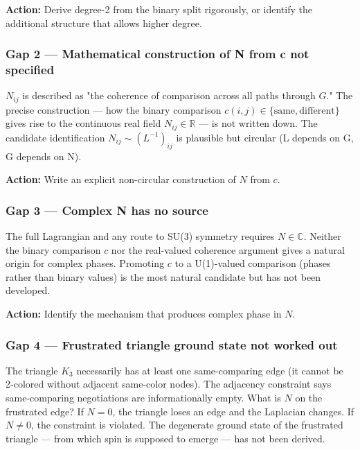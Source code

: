 \documentclass[11pt,letterpaper]{article}
\begin{document}
\textbf{Action:} Derive degree-2 from the binary split rigorously, or identify the additional structure that allows higher degree.

\subsubsection{Gap 2 --- Mathematical construction of N from c not specified}
\label{sec:org72179f7}

\(N_{ij}\) is described as "the coherence of comparison across all paths through \(G\)." The precise construction --- how the binary comparison \(c(i,j) \in \{\mathrm{same}, \mathrm{different}\}\) gives rise to the continuous real field \(N_{ij} \in \mathbb{R}\) --- is not written down. The candidate identification \(N_{ij} \sim (L^{-1})_{ij}\) is plausible but circular (L depends on G, G depends on N).

\textbf{Action:} Write an explicit non-circular construction of \(N\) from \(c\).

\subsubsection{Gap 3 --- Complex N has no source}
\label{sec:orgfd83474}

The full Lagrangian and any route to SU(3) symmetry requires \(N \in \mathbb{C}\). Neither the binary comparison \(c\) nor the real-valued coherence argument gives a natural origin for complex phases. Promoting \(c\) to a U(1)-valued comparison (phases rather than binary values) is the most natural candidate but has not been developed.

\textbf{Action:} Identify the mechanism that produces complex phase in \(N\).

\subsubsection{Gap 4 --- Frustrated triangle ground state not worked out}
\label{sec:org69073a7}

The triangle \(K_3\) necessarily has at least one same-comparing edge (it cannot be 2-colored without adjacent same-color nodes). The adjacency constraint says same-comparing negotiations are informationally empty. What is \(N\) on the frustrated edge? If \(N = 0\), the triangle loses an edge and the Laplacian changes. If \(N \neq 0\), the constraint is violated. The degenerate ground state of the frustrated triangle --- from which spin is supposed to emerge --- has not been derived.
\end{document}
